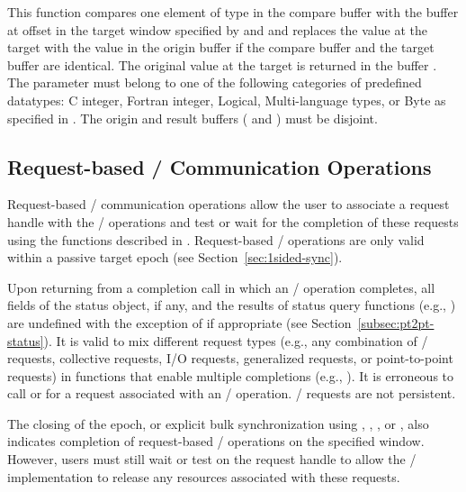 This function compares one element of type  in the
compare buffer  with the buffer at offset
 in the target window specified by
 and  and replaces the
value at the target with the value in the origin buffer
 if the compare buffer and the 
target buffer are identical.
The original value at the target is returned
in the buffer . The parameter 
must belong to one of the following categories of predefined datatypes: C integer, Fortran
integer, Logical, Multi-language types, or Byte as specified in
.
The origin and result buffers ( and
) must be disjoint. 


\subsection{Request-based \texorpdfstring{\RMA/}{RMA} Communication Operations}
\label{sec:1sided-req}

Request-based \RMA/ communication operations allow the user to
associate a request handle with the \RMA/ operations and test or wait
for the completion of these requests using the functions described in
. Request-based \RMA/ operations
are only valid within a passive target
epoch (see Section~\ref{sec:1sided-sync}). 

Upon returning from a completion call in which an \RMA/ operation
completes, all fields of the status object, if any, and the results of status query
functions (e.g., ) are undefined with the
exception of  if appropriate (see
Section~\ref{subsec:pt2pt-status}). It is
valid to mix different request types (e.g., any combination of \RMA/
requests, collective requests, I/O requests, generalized requests, or
point-to-point requests) in functions that enable multiple completions
(e.g., ). It is erroneous to call
 or  for a request
associated with an \RMA/ operation. \RMA/ requests are not persistent.

The closing of the epoch, or explicit bulk synchronization using
, ,
, or
, also indicates completion of
request-based \RMA/ operations on the specified window.
However, users must still wait or test on the request handle to allow
the \MPI/ implementation to release any resources associated with these requests.

